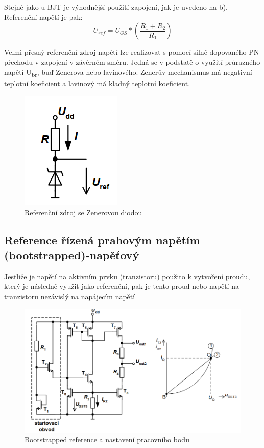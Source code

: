 Stejně jako u BJT je výhodnější použití zapojení, jak je uvedeno na b). Referenční napětí je pak:
\begin{equation}
U_{ref} = U_{GS}*(\frac{R_{1}+R_{2}}{R_{1}})
\end{equation}

Velmi přesný referenční zdroj napětí lze realizovat s pomocí silně dopovaného PN přechodu v zapojení v závěrném směru. Jedná se v podstatě o využití průrazného napětí U\textsubscript{br}, buď Zenerova nebo lavinového. Zenerův mechanismus má negativní teplotní koeficient a lavinový má kladný teplotní koeficient.
\begin{figure}[h]
   \begin{center}
     \includegraphics[scale=0.6]{images/refzen.png}
   \end{center}
   \caption{Referenční zdroj se Zenerovou diodou}
\end{figure}

\subsection{Reference řízená prahovým napětím (bootstrapped)-napěťový}
Jestliže je napětí na aktivním prvku (tranzistoru) použito k vytvoření proudu, který je následně využit jako referenční, pak je tento proud nebo napětí na tranzistoru nezávislý na napájecím napětí
\begin{figure}[h]
   \begin{center}
     \includegraphics[scale=0.6]{images/BT.png}
   \end{center}
   \caption{Bootstrapped reference a nastavení pracovního bodu}
\end{figure}

